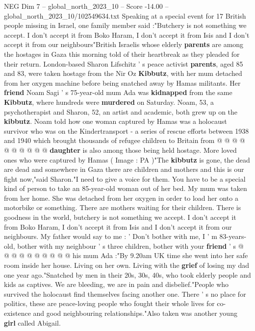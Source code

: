 \begin{textsample}{NEG Dim 7 – global\_north\_2023\_10 – Score -14.00 – global\_north\_2023\_10/102549634.txt}  \label{ex:f7_neg_022}
Speaking at a special event for 17 British people missing in Israel, one family member said :"Butchery is not something we accept.
I don't accept it from Boko Haram, I don't accept it from Isis and I don't accept it from our neighbours"British Israelis whose elderly \textbf{parents} are among the hostages in Gaza this morning told of their heartbreak as they pleaded for their return.
London-based Sharon Lifschitz ' s peace activist \textbf{parents}, aged 85 and 83, were taken hostage from the Nir Oz \textbf{Kibbutz}, with her mum detached from her oxygen machine before being snatched away by Hamas militants.
Her \textbf{friend} Noam Sagi ' s 75-year-old mum Ada was \textbf{kidnapped} from the same \textbf{Kibbutz}, where hundreds were \textbf{murdered} on Saturday.
Noam, 53, a psychotherapist and Sharon, 52, an artist and academic, both grew up on the \textbf{kibbutz}.
Noam told how one woman captured by Hamas was a holocaust survivor who was on the Kindertransport - a series of rescue efforts between 1938 and 1940 which brought thousands of refugee children to Britain from @ @ @ @ @ @ @ @ @ @ \textbf{daughter} is also among those being held hostage.
More loved ones who were captured by Hamas ( Image : PA )"The \textbf{kibbutz} is gone, the dead are dead and somewhere in Gaza there are children and mothers and this is our fight now,"said Sharon."I need to give a voice for them.
You have to be a special kind of person to take an 85-year-old woman out of her bed.
My mum was taken from her home.
She was detached from her oxygen in order to load her onto a motorbike or something.
There are mothers waiting for their children.
There is goodness in the world, butchery is not something we accept.
I don't accept it from Boko Haram, I don't accept it from Isis and I don't accept it from our neighbours.
My father would say to me : ' Don't bother with me, I ' m 83-years-old, bother with my neighbour ' s three children, bother with your \textbf{friend} ' s @ @ @ @ @ @ @ @ @ @ his mum Ada :"By 9.20am UK time she went into her safe room inside her house.
Living on her own.
Living with the \textbf{grief} of losing my dad one year ago."Snatched by men in their 20s, 30s, 40s, who took elderly people and kids as captives.
We are bleeding, we are in pain and disbelief."People who survived the holocaust find themselves facing another one.
There ' s no place for politics, these are peace-loving people who fought their whole lives for co-existence and good neighbouring relationships."Also taken was another young \textbf{girl} called Abigail.

\end{textsample}

